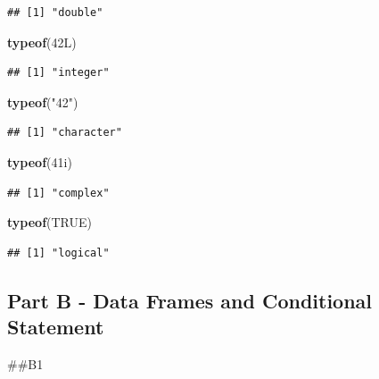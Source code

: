 \documentclass[
]{article}
\newenvironment{Shaded}{\begin{snugshade}}{\end{snugshade}}
\newcommand{\ConstantTok}[1]{\textcolor[rgb]{0.56,0.35,0.01}{#1}}
\newcommand{\DataTypeTok}[1]{\textcolor[rgb]{0.13,0.29,0.53}{#1}}
\newcommand{\DecValTok}[1]{\textcolor[rgb]{0.00,0.00,0.81}{#1}}
\newcommand{\FunctionTok}[1]{\textcolor[rgb]{0.13,0.29,0.53}{\textbf{#1}}}
\newcommand{\NormalTok}[1]{#1}
\newcommand{\StringTok}[1]{\textcolor[rgb]{0.31,0.60,0.02}{#1}}
\begin{document}
\begin{verbatim}
## [1] "double"
\end{verbatim}

\begin{Shaded}
\begin{Highlighting}[]
\FunctionTok{typeof}\NormalTok{(}\DecValTok{42}\DataTypeTok{L}\NormalTok{)}
\end{Highlighting}
\end{Shaded}

\begin{verbatim}
## [1] "integer"
\end{verbatim}

\begin{Shaded}
\begin{Highlighting}[]
\FunctionTok{typeof}\NormalTok{(}\StringTok{"42"}\NormalTok{)}
\end{Highlighting}
\end{Shaded}

\begin{verbatim}
## [1] "character"
\end{verbatim}

\begin{Shaded}
\begin{Highlighting}[]
\FunctionTok{typeof}\NormalTok{(}\DecValTok{41}\DataTypeTok{i}\NormalTok{)}
\end{Highlighting}
\end{Shaded}

\begin{verbatim}
## [1] "complex"
\end{verbatim}

\begin{Shaded}
\begin{Highlighting}[]
\FunctionTok{typeof}\NormalTok{(}\ConstantTok{TRUE}\NormalTok{)}
\end{Highlighting}
\end{Shaded}

\begin{verbatim}
## [1] "logical"
\end{verbatim}

\subsection{Part B - Data Frames and Conditional
Statement}\label{part-b---data-frames-and-conditional-statement}

\#\#B1
\end{document}
